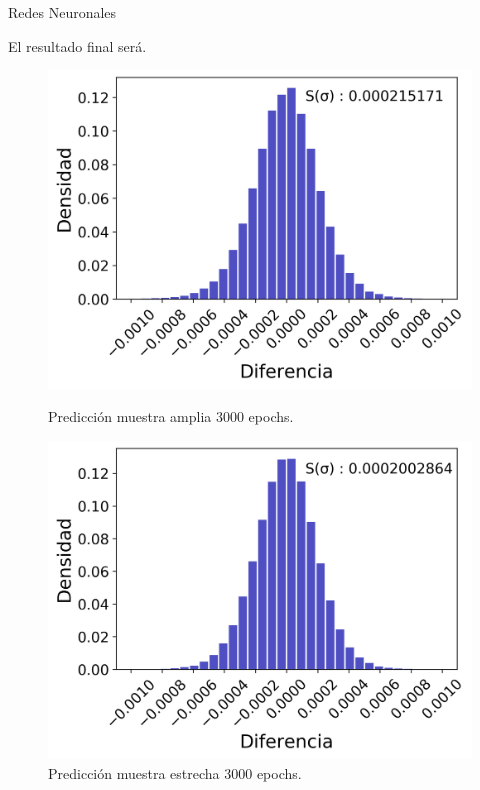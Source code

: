 \documentclass{beamer}
\begin{document}
\begin{frame}{Redes Neuronales}

  El resultado final ser\'a.
    \begin{figure}[!tbp]
      \centering
      \begin{minipage}[b]{0.45\textwidth}
        \includegraphics[width=\textwidth]{Predic_w_log_3mil.png}
        \caption{Predicci\'on muestra amplia 3000 epochs.}
      \end{minipage}
      \hfill
      \begin{minipage}[b]{0.45\textwidth}
        \includegraphics[width=\textwidth]{Predic_n_log_3mil.png}
        \caption{Predicci\'on muestra estrecha 3000 epochs.}
      \end{minipage}
    \end{figure} 


\end{frame}
\end{document}
